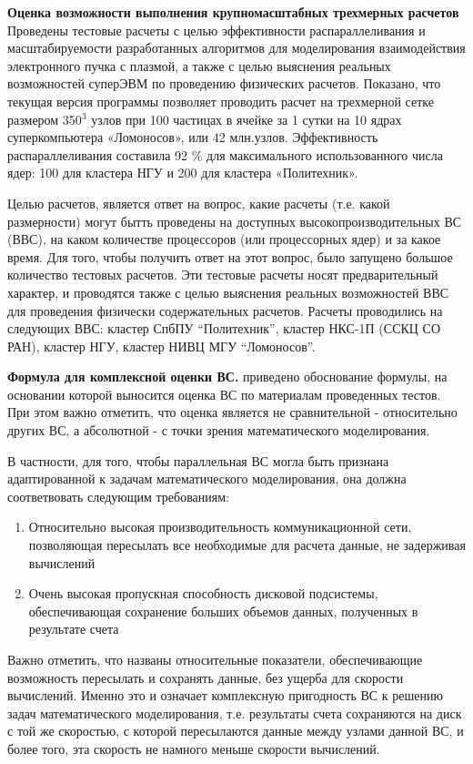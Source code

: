 \textbf{Оценка возможности выполнения крупномасштабных трехмерных расчетов}
Проведены тестовые расчеты с целью эффективности распараллеливания и масштабируемости разработанных алгоритмов для моделирования взаимодействия электронного пучка с плазмой, а также с целью выяснения реальных возможностей суперЭВМ по проведению физических расчетов. Показано, что текущая версия программы позволяет проводить расчет на трехмерной сетке размером 350$^3$ узлов при 100 частицах в ячейке за 1 сутки на 10 ядрах суперкомпьютера «Ломоносов», или 42 млн.узлов. Эффективность распараллеливания составила 92 \% для максимального использованного числа ядер: 100 для кластера НГУ и 200 для кластера «Политехник».  

Целью расчетов,  является ответ на вопрос, какие расчеты (т.е. какой размерности) могут бытть проведены на доступных высокопроизводительных  ВС (ВВС), на каком количестве процессоров (или процессорных ядер) и за какое время. 
Для того, чтобы получить ответ на этот вопрос, было запущено большое количество тестовых расчетов. Эти тестовые расчеты носят предварительный характер, и проводятся также с целью выяснения реальных возможностей ВВС для проведения физически содержательных расчетов. 	Расчеты проводились на следующих ВВС: кластер СпбПУ “Политехник”, кластер НКС-1П (ССКЦ СО РАН), кластер НГУ,  кластер НИВЦ МГУ “Ломоносов”. 

\textbf{Формула для комплексной оценки ВС.}
приведено обоснование формулы, на основании которой выносится оценка ВС по материалам проведенных тестов. При этом важно отметить, что оценка является не сравнительной - относительно других ВС, а абсолютной - с точки зрения математического моделирования. 

В частности, для того, чтобы параллельная ВС могла быть признана адаптированной к задачам математического моделирования, она должна соответвовать следующим требованиям:
\begin{enumerate}
	\item Относительно высокая производительность коммуникационной сети, позволяющая пересылать все необходимые для расчета данные, не задерживая вычислений
	\item Очень высокая пропускная способность дисковой подсистемы, обеспечивающая сохранение больших объемов данных, полученных в результате счета  	
\end{enumerate}

Важно отметить, что названы относительные показатели, обеспечивающие возможность пересылать и сохранять данные, без ущерба для скорости вычислений. Именно это и означает  комплексную пригодность ВС к решению задач математического моделирования, т.е. результаты счета сохраняются на диск с той же скоростью, с которой пересылаются данные между узлами данной ВС, и более того, эта скорость не намного меньше скорости вычислений.

